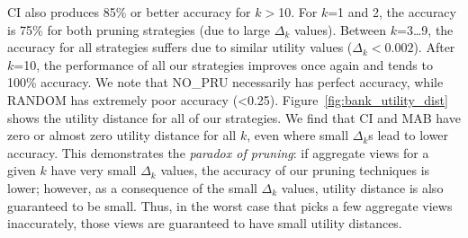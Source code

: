 CI also produces 85\% or better accuracy for $k$$>$10.
For $k$=1 and 2, the accuracy is 75\% for both pruning strategies (due to large 
$\Delta_k$ values).
Between $k$=3\ldots9, the accuracy for all strategies suffers due to similar utility values 
($\Delta_k < 0.002$).
After $k$=10, the performance of all our strategies improves once again and tends to 100\% accuracy.
We note that NO\_PRU necessarily has perfect accuracy, while RANDOM has extremely poor accuracy (<0.25).
Figure~\ref{fig:bank_utility_dist} shows the utility distance for
all of our strategies.
We find that CI and MAB have zero or almost zero utility distance for all $k$, even where small $\Delta_k$s
lead to lower accuracy.
This demonstrates the {\it paradox of pruning}: if aggregate views for a given $k$ have very small $\Delta_k$
values, the accuracy of our pruning techniques is lower; however, as a consequence of the small
$\Delta_k$ values, utility distance is also guaranteed to be small. 
Thus, in the worst case that \SeeDB picks a few aggregate views inaccurately, those views are guaranteed 
to have small utility distances.





